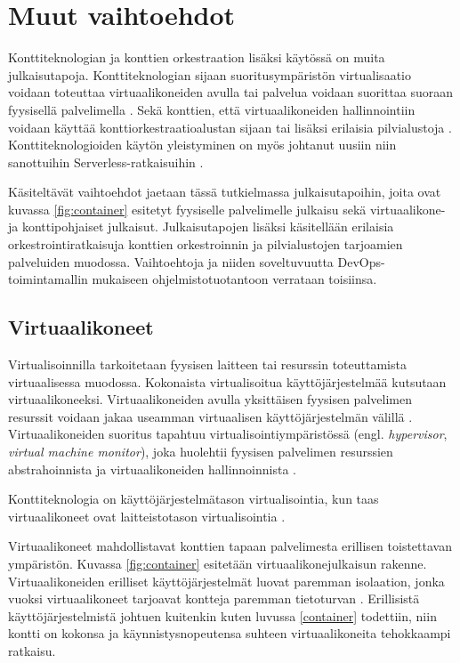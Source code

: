 \chapter{Muut vaihtoehdot\label{options}}

Konttiteknologian ja konttien orkestraation lisäksi käytössä on muita julkaisutapoja. Konttiteknologian sijaan suoritusympäristön virtualisaatio voidaan toteuttaa virtuaalikoneiden avulla tai palvelua voidaan suorittaa suoraan fyysisellä palvelimella \cite{Watada19}.
Sekä konttien, että virtuaalikoneiden hallinnointiin voidaan käyttää konttiorkestraatioalustan sijaan tai lisäksi erilaisia pilvialustoja \cite{Bousselmi14}.
Konttiteknologioiden käytön yleistyminen on myös johtanut uusiin niin sanottuihin Serverless-ratkaisuihin \cite{Baldini17}.

Käsiteltävät vaihtoehdot jaetaan tässä tutkielmassa julkaisutapoihin, joita ovat kuvassa \ref{fig:container} esitetyt fyysiselle palvelimelle julkaisu sekä virtuaalikone- ja konttipohjaiset julkaisut.
Julkaisutapojen lisäksi käsitellään erilaisia orkestrointiratkaisuja konttien orkestroinnin ja pilvialustojen tarjoamien palveluiden muodossa.
Vaihtoehtoja ja niiden soveltuvuutta DevOps-toimintamallin mukaiseen ohjelmistotuotantoon verrataan toisiinsa.

\section{Virtuaalikoneet}

Virtualisoinnilla tarkoitetaan fyysisen laitteen tai resurssin toteuttamista virtuaalisessa muodossa.
Kokonaista virtualisoitua käyttöjärjestelmää kutsutaan virtuaalikoneeksi.
Virtuaalikoneiden avulla yksittäisen fyysisen palvelimen resurssit voidaan jakaa useamman virtuaalisen käyttöjärjestelmän välillä \cite{Smith05}.
Virtuaalikoneiden suoritus tapahtuu virtualisointiympäristössä (engl. \textit{hypervisor}, \textit{virtual machine monitor}), joka huolehtii fyysisen palvelimen resurssien abstrahoinnista ja virtuaalikoneiden hallinnoinnista \cite{desai13}.

Konttiteknologia on käyttöjärjestelmätason virtualisointia, kun taas virtuaalikoneet ovat laitteistotason virtualisointia \cite{}.

Virtuaalikoneet mahdollistavat konttien tapaan palvelimesta erillisen toistettavan ympäristön.
Kuvassa \ref{fig:container} esitetään virtuaalikonejulkaisun rakenne.
Virtuaalikoneiden erilliset käyttöjärjestelmät luovat paremman isolaation, jonka vuoksi virtuaalikoneet tarjoavat kontteja paremman tietoturvan \cite{Sultan19}.
Erillisistä käyttöjärjestelmistä johtuen kuitenkin kuten luvussa \ref{container} todettiin, niin kontti on kokonsa ja käynnistysnopeutensa suhteen virtuaalikoneita tehokkaampi ratkaisu.

